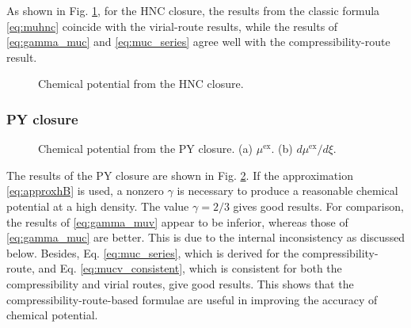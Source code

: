 \documentclass[aip,jcp,reprint,superscriptaddress]{revtex4-1}
\newcommand{\supex}[1]{ { { #1 }^{ \mathrm{ex} } } }
\newcommand{\muex}{\supex{\mu}}
\begin{document}
As shown in Fig. \ref{fig:muhnc},
for the HNC closure,
%
the results from the classic formula \eqref{eq:muhnc}
coincide with the virial-route results,
%
while the results of \eqref{eq:gamma_muc} and \eqref{eq:muc_series}
agree well with the compressibility-route result.
%


\begin{figure}[h]
  \caption{
    \label{fig:muhnc}
    Chemical potential from the HNC closure.
  }
\end{figure}




\subsubsection{PY closure}

\begin{figure}[h]
  \caption{
    \label{fig:mupy}
    Chemical potential from the PY closure.
    (a) $\muex$. (b) $d\muex/d\xi$.
  }
\end{figure}



The results of the PY closure are shown in Fig. \ref{fig:mupy}.
%
If the approximation \eqref{eq:approxhB} is used,
a nonzero $\gamma$ is necessary
to produce a reasonable chemical potential at a high density.
%
The value $\gamma = 2/3$ gives good results.
%
For comparison,
the results of \eqref{eq:gamma_muv}
appear to be inferior,
whereas those of \eqref{eq:gamma_muc} are better.
%
This is due to the internal inconsistency
as discussed below.
%
Besides,
Eq. \eqref{eq:muc_series}, which is derived for the compressibility-route,
and
Eq. \eqref{eq:mucv_consistent}, which is consistent for both
the compressibility and virial routes,
give good results.
%
This shows that the compressibility-route-based formulae
are useful in improving the accuracy of chemical potential.
\end{document}
